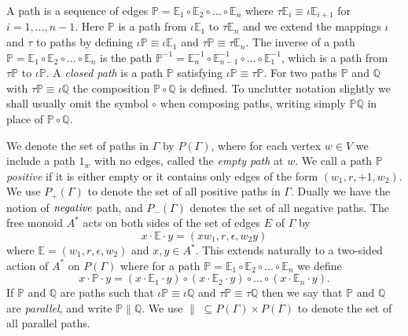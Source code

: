 \documentclass[11pt]{amsart}
\theoremstyle{plain}
\begin{document}
A path is a sequence of edges ${\mathbb{P}} = {\mathbb{E}}_1 \circ {\mathbb{E}}_2 \circ \ldots \circ {\mathbb{E}}_n$ where $\tau {\mathbb{E}}_i  \equiv \iota {\mathbb{E}}_{i+1}$ for $i=1, \ldots, n-1$. Here ${\mathbb{P}}$ is a path from $\iota {\mathbb{E}}_1$ to $\tau {\mathbb{E}}_n$ and we extend the mappings $\iota$ and $\tau$ to paths by defining $\iota {\mathbb{P}} \equiv \iota {\mathbb{E}}_1$ and $\tau {\mathbb{P}} \equiv \tau {\mathbb{E}}_n$.  The inverse of a path ${\mathbb{P}} = {\mathbb{E}}_1 \circ {\mathbb{E}}_2 \circ \ldots \circ {\mathbb{E}}_n$ is the path ${\mathbb{P}}^{-1} = {\mathbb{E}}_n^{-1} \circ {\mathbb{E}}_{n-1}^{-1} \circ \ldots \circ {\mathbb{E}}_1^{-1}$, which is a path from $\tau {\mathbb{P}}$ to $\iota {\mathbb{P}}$. A \emph{closed path} is a path ${\mathbb{P}}$ satisfying $\iota {\mathbb{P}} \equiv \tau {\mathbb{P}}$. For two paths ${\mathbb{P}}$ and ${\mathbb{Q}}$ with $\tau {\mathbb{P}} \equiv \iota {\mathbb{Q}}$ the composition ${\mathbb{P}} \circ {\mathbb{Q}}$ is defined. To unclutter notation slightly we shall usually omit the  symbol $\circ$ when composing paths, writing simply ${\mathbb{P}} {\mathbb{Q}}$ in place of ${\mathbb{P}} \circ {\mathbb{Q}}$.

We denote the set of paths in $\Gamma$ by $P(\Gamma)$, where for each vertex $w \in V$ we include a path $1_w$ with no edges, called the \emph{empty path} at $w$. We call a path ${\mathbb{P}}$ \emph{positive} if it is either empty or it contains only edges of the form $(w_1, r, +1, w_2)$. We use $P_+(\Gamma)$ to denote the set of all positive paths in $\Gamma$. Dually we have the notion of $\emph{negative}$ path, and $P_-(\Gamma)$ denotes the set of all negative paths. The free monoid $A^*$ acts on both sides of the set of edges $E$ of $\Gamma$ by
\[
x \cdot {\mathbb{E}} \cdot y = (x w_1, r, \epsilon, w_2 y)
\]
where ${\mathbb{E}} = (w_1, r, \epsilon, w_2)$ and $x, y \in A^*$. This extends naturally to a two-sided action of $A^*$ on $P(\Gamma)$ where for a path ${\mathbb{P}} = {\mathbb{E}}_1 \circ {\mathbb{E}}_2 \circ \ldots \circ {\mathbb{E}}_n$ we define
\[
x \cdot {\mathbb{P}} \cdot y = (x \cdot {\mathbb{E}}_1 \cdot y) \circ (x \cdot {\mathbb{E}}_2 \cdot y)
\circ \ldots \circ (x \cdot {\mathbb{E}}_n \cdot y).
\]
If ${\mathbb{P}}$ and ${\mathbb{Q}}$ are paths such that $\iota {\mathbb{P}} \equiv \iota {\mathbb{Q}}$ and $\tau {\mathbb{P}} \equiv \tau {\mathbb{Q}}$ then we say that ${\mathbb{P}}$ and ${\mathbb{Q}}$ are \emph{parallel}, and write ${\mathbb{P}} \parallel {\mathbb{Q}}$. We use $\parallel\; \subseteq P(\Gamma) \times P(\Gamma)$ to denote the set of all parallel paths.
\end{document}
